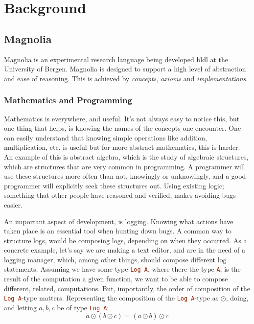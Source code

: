 \chapter{Background} \label{cha:background}

\section{Magnolia}

Magnolia is an experimental research language being developed \gls{bldl} at the
University of Bergen. Magnolia is designed to support a high level of abstraction
and ease of reasoning. This is achieved by \textit{concepts}, \textit{axioms} and
\textit{implementations}.


\subsection{Mathematics and Programming}

Mathematics is everywhere, and useful. It's not always easy to notice this, but
one thing that helps, is knowing the names of the concepts one encounter. One
can easily understand that knowing simple operations like addition,
multiplication, etc. is useful but for more abstract mathematics, this is
harder. An example of this is abstract algebra, which is the study of algebraic
structures, which are structures that are very common in programming. A
programmer will use these structures more often than not, knowingly or
unknowingly, and a good programmer will explicitly seek these structures out.
Using existing logic; something that other people have reasoned and verified,
makes avoiding bugs easier.

An important aspect of development, is logging. Knowing what actions have taken
place is an essential tool when hunting down bugs. A common way to structure
logs, would be composing logs, depending on when they occurred. As a concrete
example, let's say we are making a text editor, and are in the need of a logging
manager, which, among other things, should compose different log statements.
Assuming we have some type \lstinline[language=Haskell]{Log A}, where there the
type \lstinline[language=Haskell]{A}, is the result of the computation a given
function, we want to be able to compose different, related, computations. But,
importantly, the order of composition of the
\lstinline[language=Haskell]{Log A}-type matters. Representing the composition
of the \lstinline[language=Haskell]{Log A}-type as $\odot$, doing, and letting
$a, b, c$ be of type \lstinline[language=Haskell]{Log A}:
\begin{equation}
  a \odot \left ( b \odot c \right ) = \left ( a \odot b \right ) \odot c
\end{equation}

